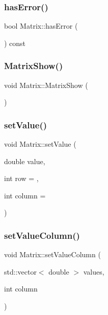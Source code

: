 \mbox{\label{classMatrix_abf6343d2b9345e08ef800fbc8f19e34e}} 
\subsubsection{\texorpdfstring{has\+Error()}{hasError()}}
{\footnotesize\ttfamily bool Matrix\+::has\+Error (\begin{DoxyParamCaption}{ }\end{DoxyParamCaption}) const}

\mbox{\label{classMatrix_a3c6fbdb8a8073ec2b2000614777ae930}} 
\subsubsection{\texorpdfstring{Matrix\+Show()}{MatrixShow()}}
{\footnotesize\ttfamily void Matrix\+::\+Matrix\+Show (\begin{DoxyParamCaption}{ }\end{DoxyParamCaption})\hspace{0.3cm}{\ttfamily [inline]}}

\mbox{\label{classMatrix_a8271fe6ec51ea43fdf77f4b7f96333d9}} 
\subsubsection{\texorpdfstring{set\+Value()}{setValue()}}
{\footnotesize\ttfamily void Matrix\+::set\+Value (\begin{DoxyParamCaption}\item[{double}]{value,  }\item[{int}]{row = {},  }\item[{int}]{column = {} }\end{DoxyParamCaption})}

\mbox{\label{classMatrix_a1c77e71a031b6f116b9dfa328f70009b}} 
\subsubsection{\texorpdfstring{set\+Value\+Column()}{setValueColumn()}}
{\footnotesize\ttfamily void Matrix\+::set\+Value\+Column (\begin{DoxyParamCaption}\item[{std\+::vector$<$ double $>$}]{values,  }\item[{int}]{column }\end{DoxyParamCaption})}

